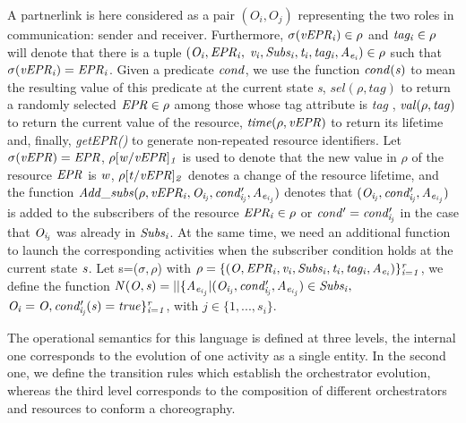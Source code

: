 A partnerlink is here considered as a pair $(O_i,O_j)$ representing the two roles in communication: sender and receiver. Furthermore, $\it{\sigma(vEPR_i) \in \rho}$ and $\it{tag_i \in \rho}$ will denote that there is a tuple $\it{(O_i,EPR_i,}$ ${\it v_i,Subs_i,t_i,tag_i,A_{e{_i}}) \in \rho}$ such that $\it{\sigma(vEPR_i)=EPR_i}$. Given a predicate $\it{cond}$, we use the function $\it{cond(s)}$ to mean the resulting value of this predicate at the current state {\it s}, {\it $sel(\rho,tag)$} to return a randomly selected ${\it EPR \in \rho}$ among those whose tag attribute is {\em tag} , ${\it val(\rho,tag)}$ to return the current value of the resource, ${\it time(\rho,vEPR)}$ to return its lifetime and, finally, {\it getEPR()} to generate non-repeated resource identifiers. Let ${\it \sigma(vEPR)=EPR}$, ${\it \rho[w/vEPR]_1}$ is used to denote that the new value in $\rho$ of the resource $\it{EPR}$ is $\it{w}$, $\it{\rho[t/vEPR]_2}$ denotes a change of the resource lifetime, and the function $\it{Add\_subs(\rho,vEPR_i,O_{i_{j}},cond'_{i_{j}},A_{e{_i{_{_j}}}})}$ denotes that $\it{(O_{i_{j}},cond'_{i_{j}},A_{e{_i{_{_j}}}})}$ is added to the subscribers of the resource $\it{EPR_i \in \rho}$ or ${\it cond'=cond'_{i_{j}}}$ in the case that $\it{O_{i_{j}}}$ was already in ${\it Subs_i}$.
At the same time, we need an additional function to launch the corresponding activities %
when the subscriber condition holds at the current state ${\it s}$. Let s=($\sigma, \rho$) with $\it{ \rho=\{(O,EPR_i,v_i,Subs_i,t_i,tag_i,A_{e{_i}})\}_{i=1}^r}$, we define the function ${\it N(O,s)=||\{A_{e{_i{_{_j}}}}|(O_{i{_j}},cond'_{i_{j}},A_{e{_i{_{_j}}}}) \in Subs_i,}$
${\it O_{i}=O, cond'_{i_{j}}(s)=true\}_{i=1}^r}$, with $j \in \{1,...,s_i\}$.

The operational semantics for this language is defined at three levels, the internal one corresponds to the evolution of one activity as a single entity. In the second one, we define
the transition rules which establish the orchestrator evolution, whereas the third level corresponds to the composition
of different orchestrators and resources to conform a choreography.

